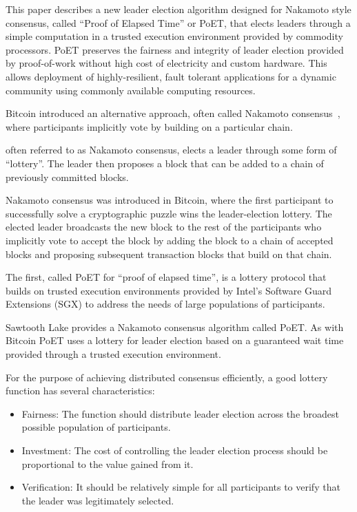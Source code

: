 This paper describes a new leader election algorithm designed for Nakamoto style consensus, called ``Proof of Elapsed
Time'' or PoET, that elects leaders through a simple computation in a trusted execution environment provided by
commodity processors. PoET preserves the fairness and integrity of leader election provided by proof-of-work without
high cost of electricity and custom hardware. This allows deployment of highly-resilient, fault tolerant applications
for a dynamic community using commonly available computing resources. 



Bitcoin introduced an alternative approach, often called Nakamoto consensus~\cite{}, where participants implicitly vote
by building on a particular chain. 

often referred to as Nakamoto consensus, elects
a leader through some form of ``lottery''. The leader then proposes a block that can be added to a chain of previously
committed blocks.


Nakamoto consensus was introduced in Bitcoin, where the first participant to successfully solve a cryptographic
puzzle wins the leader-election lottery. The elected leader broadcasts the new block to the rest of the participants who
implicitly vote to accept the block by adding the block to a chain of accepted blocks and proposing subsequent
transaction blocks that build on that chain.

The first, called PoET for ``proof of elapsed time'', is a lottery protocol that builds on trusted execution
environments provided by Intel's Software Guard Extensions (SGX) to address the needs of large populations of
participants.

Sawtooth Lake provides a Nakamoto consensus algorithm called PoET. As with Bitcoin PoET uses a lottery for leader
election based on a guaranteed wait time provided through a trusted execution environment. 

For the purpose of achieving distributed consensus efficiently, a good lottery function has several characteristics:

\begin{itemize}
\item Fairness:
  The function should distribute leader election across the broadest possible population of participants.

\item Investment:
  The cost of controlling the leader election process should be proportional to the value gained from it. 

\item Verification:
  It should be relatively simple for all participants to verify that the leader was legitimately selected. 
\end{itemize}

